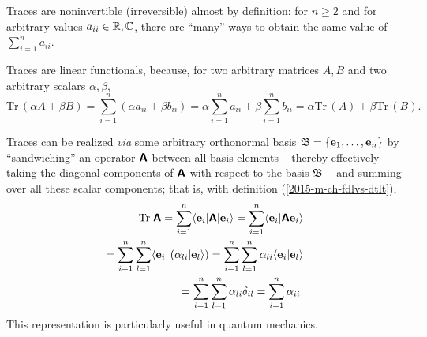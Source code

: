 Traces are noninvertible (irreversible) almost by definition: for $n\ge 2$ and for arbitrary values $a_{ii} \in {\Bbb R}, {\Bbb C}$, there are
``many''  ways to obtain the same value of $ \sum_{i=1}^n a_{ii} $.

Traces are linear functionals, because, for two arbitrary matrices $A,B$
and two arbitrary scalars $\alpha, \beta$,
\begin{equation}
\textrm{Tr}\,(\alpha A + \beta B)
=\sum_{i=1}^n (\alpha a_{ii} + \beta b_{ii})
= \alpha \sum_{i=1}^n a_{ii} + \beta \sum_{i=1}^n  b_{ii}
=
\alpha \textrm{Tr}\,(A)+ \beta \textrm{Tr}\,(B)
.
\end{equation}

Traces can be realized {\it via} some arbitrary orthonormal basis ${\frak B} =\{
{\bf e}_1,
\ldots ,
{\bf e}_n
\}$
by ``sandwiching'' an operator $\textsf{\textbf{A}}$ between all basis elements -- thereby effectively taking the diagonal components
of    $\textsf{\textbf{A}}$ with respect to the basis ${\frak B}$ --
and summing over all these scalar components; that is, with definition (\ref{2015-m-ch-fdlvs-dtlt}),
\begin{equation}
\begin{split}
\textrm{Tr}\;\textsf{\textbf{A}}
=\sum_{i=1}^n   \langle {\bf e}_i \vert \textsf{\textbf{A}} \vert {\bf e}_i \rangle
=\sum_{i=1}^n   \langle {\bf e}_i \vert \textsf{\textbf{A}}  {\bf e}_i \rangle  \\
=\sum_{i=1}^n  \sum_{l=1}^n  \langle {\bf e}_i \vert \left(\alpha_{li} \vert  {\bf e}_l \rangle \right)
=\sum_{i=1}^n  \sum_{l=1}^n  \alpha_{li} \langle {\bf e}_i \vert  {\bf e}_l \rangle \\
=\sum_{i=1}^n  \sum_{l=1}^n  \alpha_{li} \delta_{il}
=\sum_{i=1}^n   \alpha_{ii}
.
\end{split}
\end{equation}
This representation is particularly useful in quantum mechanics.

